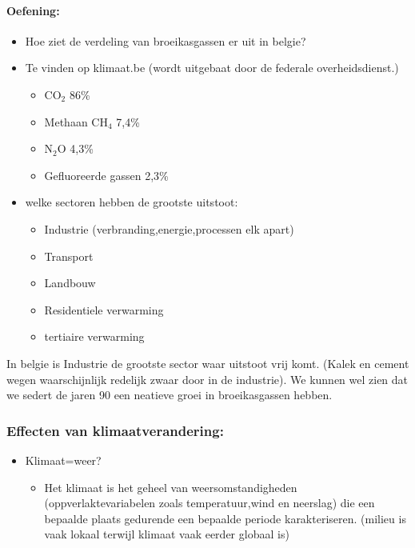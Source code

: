 \documentclass[12pt]{article}
\begin{document}
\paragraph{Oefening:}
\begin{itemize}
    \item Hoe ziet de verdeling van broeikasgassen er uit in belgie?
    \item Te vinden op klimaat.be (wordt uitgebaat door de federale overheidsdienst.)\begin{itemize}
        \item CO$_2$ 86\% 
        \item Methaan CH$_4$ 7,4\%
        \item N$_2$O 4,3\%
        \item Gefluoreerde gassen 2,3\%
    \end{itemize}
    \item welke sectoren hebben de grootste uitstoot:\begin{itemize}
        \item Industrie (verbranding,energie,processen elk apart)
        \item Transport 
        \item Landbouw 
        \item Residentiele verwarming 
        \item tertiaire verwarming
    \end{itemize}
\end{itemize}
In belgie is Industrie de grootste sector waar uitstoot vrij komt. (Kalek en cement wegen waarschijnlijk redelijk zwaar door in de industrie). We kunnen wel zien dat we sedert de jaren 90 een neatieve groei in broeikasgassen hebben.
\subsubsection{Effecten van klimaatverandering:}
\begin{itemize}
    \item Klimaat=weer?\begin{itemize}
        \item Het klimaat is het geheel van weersomstandigheden (oppverlaktevariabelen zoals temperatuur,wind en neerslag) die een bepaalde plaats gedurende een bepaalde periode karakteriseren. (milieu is vaak lokaal terwijl klimaat vaak eerder globaal is)
    \end{itemize}
\end{itemize}
\end{document}
